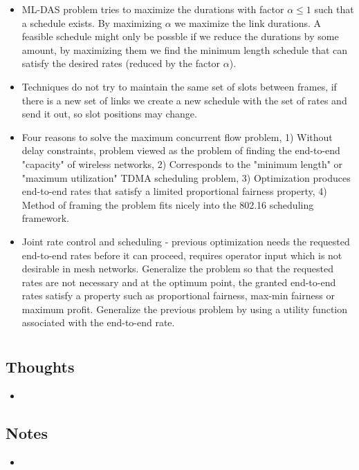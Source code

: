 \documentclass{article}
\begin{document}
\begin{itemize}
    \item ML-DAS problem tries to maximize the durations with factor $\alpha \leq 1$ such that a schedule exists.  By maximizing $\alpha$ we maximize the link durations.  A feasible schedule might only be possble if we reduce the durations by some amount, by maximizing them we find the minimum length schedule that can satisfy the desired rates (reduced by the factor $\alpha$).
    \item Techniques do not try to maintain the same set of slots between frames, if there is a new set of links we create a new schedule with the set of rates and send it out, so slot positions may change.
    \item Four reasons to solve the maximum concurrent flow problem, 1) Without delay constraints, problem viewed as the problem of finding the end-to-end "capacity" of wireless networks, 2) Corresponds to the "minimum length" or "maximum utilization" TDMA scheduling problem, 3) Optimization produces end-to-end rates that satisfy a limited proportional fairness property, 4) Method of framing the problem fits nicely into the 802.16 scheduling framework.
    \item Joint rate control and scheduling - previous optimization needs the requested end-to-end rates before it can proceed, requires operator input which is not desirable in mesh networks.  Generalize the problem so that the requested rates are not necessary and at the optimum point, the granted end-to-end rates satisfy a property such as proportional fairness, max-min fairness or maximum profit. Generalize the previous problem by using a utility function associated with the end-to-end rate.
\end{itemize}

\section{}

\subsection{Thoughts}
\begin{itemize}
    \item
\end{itemize}

\subsection{Notes}
\begin{itemize}
    \item
\end{itemize}
\end{document}
